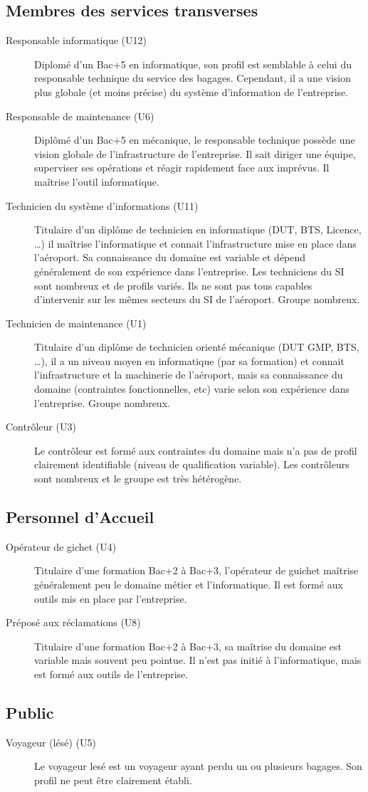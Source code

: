 \documentclass{article}
\begin{document}
\subsection{Membres des services transverses}
\begin{description}
\item[Responsable informatique (U12)] Diplomé d'un Bac+5 en informatique, son
profil est semblable à celui du responsable technique du service des bagages.
Cependant, il a une vision plus globale (et moins précise) du système
d'information de l'entreprise.
\item[Responsable de maintenance (U6)] Diplômé d'un Bac+5 en mécanique, le
responsable technique possède une vision globale de l'infrastructure de
l'entreprise. Il sait diriger une équipe, superviser ses opérations et réagir
rapidement face aux imprévus. Il maîtrise l'outil informatique.
\item[Technicien du système d'informations (U11)] Titulaire d'un diplôme de
technicien en informatique (DUT, BTS, Licence, \ldots) il maîtrise l'informatique et
connait l'infrastructure mise en place dans l'aéroport. Sa connaissance du
domaine est variable et dépend généralement de son expérience dans l'entreprise.
Les techniciens du SI sont nombreux et de profils variés. Ils ne sont pas tous
capables d'intervenir sur les mêmes secteurs du SI de l'aéroport. Groupe
nombreux.
\item[Technicien de maintenance (U1)] Titulaire d'un diplôme de technicien
orienté mécanique (DUT GMP, BTS, \ldots), il a un niveau moyen en informatique (par sa
formation) et connait l'infrastructure et la machinerie de l'aéroport, mais sa
connaissance du domaine (contraintes fonctionnelles, etc) varie selon son
expérience dans l'entreprise. Groupe nombreux. 
\item[Contrôleur (U3)] Le contrôleur est formé aux contraintes du domaine mais
n'a pas de profil clairement identifiable (niveau de qualification variable). Les
contrôleurs sont nombreux et le groupe est très hétérogène.
\end{description}

\subsection{Personnel d'Accueil}
\begin{description}
\item[Opérateur de gichet (U4)] Titulaire d'une formation Bac+2 à Bac+3,
l'opérateur de guichet maîtrise généralement peu le domaine métier et l'informatique. Il est
formé aux outils mis en place par l'entreprise.
\item[Préposé aux réclamations (U8)] Titulaire d'une formation Bac+2 à Bac+3, sa
maîtrise du domaine est variable mais souvent peu pointue. Il n'est pas initié à
l'informatique, mais est formé aux outils de l'entreprise.
\end{description}

\subsection{Public}
\begin{description}
\item[Voyageur (lésé) (U5)] Le voyageur lesé est un voyageur ayant perdu un ou
plusieurs bagages. Son profil ne peut être clairement établi.
\end{description}
\end{document}
